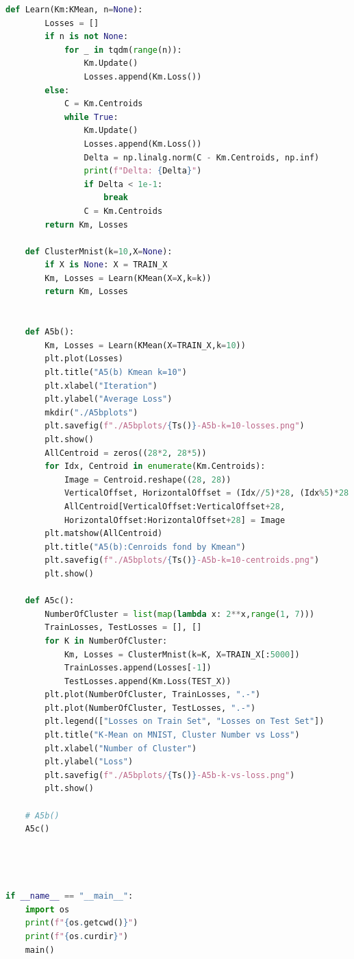 \documentclass[]{article}
\begin{document}
\begin{lstlisting}[language=python]
    def Learn(Km:KMean, n=None):
        Losses = []
        if n is not None:
            for _ in tqdm(range(n)):
                Km.Update()
                Losses.append(Km.Loss())
        else:
            C = Km.Centroids
            while True:
                Km.Update()
                Losses.append(Km.Loss())
                Delta = np.linalg.norm(C - Km.Centroids, np.inf)
                print(f"Delta: {Delta}")
                if Delta < 1e-1:
                    break
                C = Km.Centroids
        return Km, Losses

    def ClusterMnist(k=10,X=None):
        if X is None: X = TRAIN_X
        Km, Losses = Learn(KMean(X=X,k=k))
        return Km, Losses


    def A5b():
        Km, Losses = Learn(KMean(X=TRAIN_X,k=10))
        plt.plot(Losses)
        plt.title("A5(b) Kmean k=10")
        plt.xlabel("Iteration")
        plt.ylabel("Average Loss")
        mkdir("./A5bplots")
        plt.savefig(f"./A5bplots/{Ts()}-A5b-k=10-losses.png")
        plt.show()
        AllCentroid = zeros((28*2, 28*5))
        for Idx, Centroid in enumerate(Km.Centroids):
            Image = Centroid.reshape((28, 28))
            VerticalOffset, HorizontalOffset = (Idx//5)*28, (Idx%5)*28
            AllCentroid[VerticalOffset:VerticalOffset+28,
            HorizontalOffset:HorizontalOffset+28] = Image
        plt.matshow(AllCentroid)
        plt.title("A5(b):Cenroids fond by Kmean")
        plt.savefig(f"./A5bplots/{Ts()}-A5b-k=10-centroids.png")
        plt.show()

    def A5c():
        NumberOfCluster = list(map(lambda x: 2**x,range(1, 7)))
        TrainLosses, TestLosses = [], []
        for K in NumberOfCluster:
            Km, Losses = ClusterMnist(k=K, X=TRAIN_X[:5000])
            TrainLosses.append(Losses[-1])
            TestLosses.append(Km.Loss(TEST_X))
        plt.plot(NumberOfCluster, TrainLosses, ".-")
        plt.plot(NumberOfCluster, TestLosses, ".-")
        plt.legend(["Losses on Train Set", "Losses on Test Set"])
        plt.title("K-Mean on MNIST, Cluster Number vs Loss")
        plt.xlabel("Number of Cluster")
        plt.ylabel("Loss")
        plt.savefig(f"./A5bplots/{Ts()}-A5b-k-vs-loss.png")
        plt.show()

    # A5b()
    A5c()




if __name__ == "__main__":
    import os
    print(f"{os.getcwd()}")
    print(f"{os.curdir}")
    main()            
        \end{lstlisting}
\end{document}
